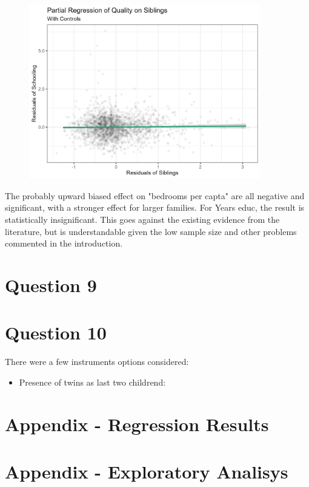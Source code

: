 \documentclass[12pt]{article}
\begin{document}
\begin{figure}
    \centering
    \includegraphics[width=0.9\textwidth]{Figures/quality_controls.png}
    \label{fig:quality_controls}
\end{figure}

The probably upward biased effect on "bedrooms per capta" are all negative and significant, with a stronger effect for larger families. For Years educ, the result is statistically insignificant. This goes against the existing evidence from the literature, but is understandable given the low sample size and other problems commented in the introduction.


\section*{Question 9}


\section*{Question 10}
There were a few instruments options considered:

\begin{itemize}
    \item Presence of twins as last two childrend: 
\end{itemize}

\section*{Appendix - Regression Results}\label{sec:results}







%


\section*{Appendix - Exploratory Analisys}\label{sec:explore}


%
%
\end{document}
